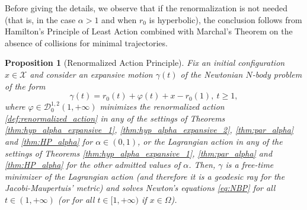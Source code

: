\documentclass[a4paper,10pt]{amsart}
\theoremstyle{plain}
\newtheorem{prop}[thm]{Proposition}
\theoremstyle{definition}
\numberwithin{equation}{section}
\numberwithin{thm}{section}
\begin{document}
Before giving the details, we observe that if the renormalization is not needed (that is, in the case $\alpha > 1$ and when $r_0$ is hyperbolic), the conclusion follows from Hamilton's Principle of Least Action combined with Marchal's Theorem on the absence of collisions for minimal trajectories.

\begin{prop}[Renormalized Action Principle]\label{th:ren_act_pr}
Fix an initial configuration $x \in \mathcal{X}$ and consider an expansive motion $\gamma(t)$ of the Newtonian $N$-body problem of the form 
    \begin{displaymath}
        \gamma(t)=r_0(t) + \varphi(t)+x-r_0(1), \ t \ge 1,
    \end{displaymath}
    where $\varphi\in\mathcal{D}_0^{1,2}(1,+\infty)$ minimizes the renormalized action \eqref{def:renormalized_action} in any of the settings of Theorems \ref{thm:hyp_alpha_expansive_1}, \ref{thm:hyp_alpha_expansive_2}, \ref{thm:par_alpha} and \ref{thm:HP_alpha} for $\alpha\in(0,1)$, or the Lagrangian action in any of the settings of Theorems \ref{thm:hyp_alpha_expansive_1}, \ref{thm:par_alpha} and \ref{thm:HP_alpha} {for the other admitted values of $\alpha$}.
    Then, $\gamma$ is a free-time minimizer of the Lagrangian action (and therefore it is a geodesic ray for the Jacobi-Maupertuis' metric) and solves Newton's equations \eqref{eq:NBP} for all $t \in (1,+\infty)$ (or for all $t \in [1, +\infty)$ if $x \in \Omega$).
\end{prop}
\end{document}
